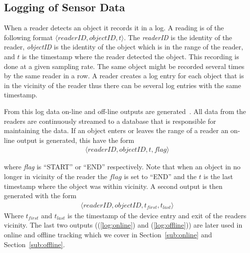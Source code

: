 \subsection{Logging of Sensor Data}
When a reader detects an object it records it in a log. 
A reading is of the following format $\langle readerID,objectID,t\rangle$.
The \textit{readerID} is the identity of the reader, \textit{objectID} is the identity of the object which is in the range of the reader, and $t$
is the timestamp where the reader detected the object.
This recording is done at a given sampling rate. 
The same object might be recorded several times by the same reader in a row. 
A reader creates a log entry for each object that is in the vicinity of the reader thus there can be several log entries with the same timestamp.

From this log data on-line and off-line outputs are generated~\cite{Jensen:2009:GMB:1590953.1591000}.
All data from the readers are continuously streamed to a database that is responsible for maintaining the data.
If an object enters or leaves the range of a reader an on-line output is generated, this have the form
\begin{align}
\label{log:online}
\langle readerID,objectID,t,flag \rangle
\end{align}

where \textit{flag} is ``START'' or ``END'' respectively. 
Note that when an object in no longer in vicinity of the reader  the $flag$ is set to ``END'' and the $t$ is the last timestamp where the object was within vicinity.
A second output is then generated with the form 
\begin{align}
\label{log:offline}
\langle readerID,objectID,t_{first},t_{last} \rangle
\end{align}
Where $t_{first}$ and $t_{last}$ is the timestamp of the device entry and exit of the readers vicinity.
The last two outputs ((\ref{log:online}) and (\ref{log:offline})) are later used in online and offline tracking which we cover in Section~\ref{sub:online} and Section~\ref{sub:offline}.

 
